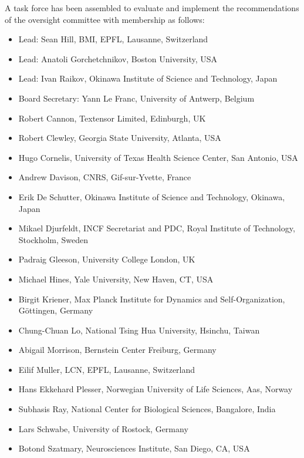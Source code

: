 \documentclass{article}
\begin{document}
A task force has been assembled to evaluate and implement the
recommendations of the oversight committee with membership as follows:

\begin{itemize}
    \item Lead: Sean Hill, BMI, EPFL, Lausanne, Switzerland
    \item Lead: Anatoli Gorchetchnikov, Boston University, USA
    \item Lead: Ivan Raikov, Okinawa Institute of Science and Technology, Japan
    \item Board Secretary: Yann Le Franc, University of Antwerp, Belgium
    \item Robert Cannon, Textensor Limited, Edinburgh, UK
    \item Robert Clewley, Georgia State University, Atlanta, USA
    \item Hugo Cornelis, University of Texas Health Science Center, San Antonio, USA
    \item Andrew Davison, CNRS, Gif-sur-Yvette, France
    \item Erik De Schutter, Okinawa Institute of Science and Technology, Okinawa, Japan
    \item Mikael Djurfeldt, INCF Secretariat and PDC,
Royal Institute of Technology, Stockholm, Sweden
    \item Padraig Gleeson, University College London, UK
    \item Michael Hines, Yale University, New Haven, CT, USA
    \item Birgit Kriener, Max Planck Institute for Dynamics and Self-Organization,
Göttingen, Germany
    \item Chung-Chuan Lo, National Tsing Hua University, Hsinchu, Taiwan
    \item Abigail Morrison, Bernstein Center Freiburg, Germany
    \item Eilif Muller, LCN, EPFL, Lausanne, Switzerland
    \item Hans Ekkehard Plesser, Norwegian University of Life Sciences, Aas, Norway
    \item Subhasis Ray, National Center for Biological Sciences, Bangalore, India
    \item Lars Schwabe, University of Rostock, Germany
    \item Botond Szatmary, Neurosciences Institute, San Diego, CA, USA

\end{itemize}
\end{document}
